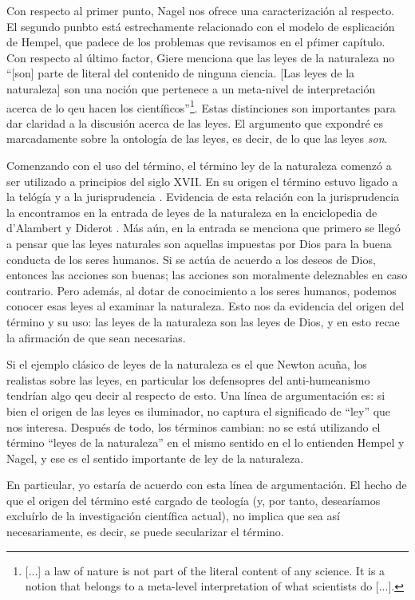 Con respecto al primer punto, Nagel nos ofrece una caracterización al respecto. El segundo punbto está estrechamente relacionado con el modelo de esplicación de Hempel, que padece de los problemas que revisamos en el pŕimer capítulo. Con respecto al último factor, Giere \citeyear[p. 69]{Giere2006} menciona que las leyes de la naturaleza no ``[son] parte de literal del contenido de ninguna ciencia. [Las leyes de la naturaleza] son una noción que pertenece a un meta-nivel de interpretación acerca de lo qeu hacen los científicos''\footnote{[...] a law of nature is not part of the literal content of any science. It is a notion that belongs to a meta-level interpretation of what scientists do [...].}. Estas distinciones son importantes para dar claridad a la discusión acerca de las leyes. El argumento que expondré es marcadamente sobre la ontología de las leyes, es decir, de lo que las leyes \textit{son}.

Comenzando con el uso del término, el término ley de la naturaleza comenzó a ser utilizado a principios del siglo XVII. En su origen el término estuvo ligado a la telógía y a la jurisprudencia \cite{Giere2006, Giere1999}. Evidencia de esta relación con la jurisprudencia la encontramos en la entrada de leyes de la naturaleza en la enciclopedia de d'Alambert y Diderot \cite{lawna}. Más aún, en la entrada se menciona que primero se llegó a pensar que las leyes naturales son aquellas impuestas por Dios para la buena conducta de los seres humanos. Si se actúa de acuerdo a los deseos de Dios, entonces las acciones son buenas; las acciones son moralmente deleznables en caso contrario. Pero además, al dotar de conocimiento a los seres humanos, podemos conocer esas leyes al examinar la naturaleza. Esto nos da evidencia del origen del término y su uso: las leyes de  la naturaleza son las leyes de Dios, y en esto recae la afirmación de que sean necesarias.

Si el ejemplo clásico de leyes de la naturaleza es el que Newton acuña, los realistas sobre las leyes, en particular los defensopres del anti-humeanismo tendrían algo qeu decir al respecto de esto. Una línea de argumentación es: si bien el origen de las leyes es iluminador, no captura el significado de ``ley'' que nos interesa. Después de todo, los términos cambian: no se está utilizando el término ``leyes de la naturaleza'' en el mismo sentido en el lo entienden Hempel y Nagel, y ese es el sentido importante de ley de la naturaleza.

En particular, yo estaría de acuerdo con esta línea de argumentación. El hecho de que el origen del término esté cargado de teología (y, por tanto, desearíamos excluírlo de la investigación científica actual), no implica que sea así necesariamente, es decir, se puede secularizar el término.

